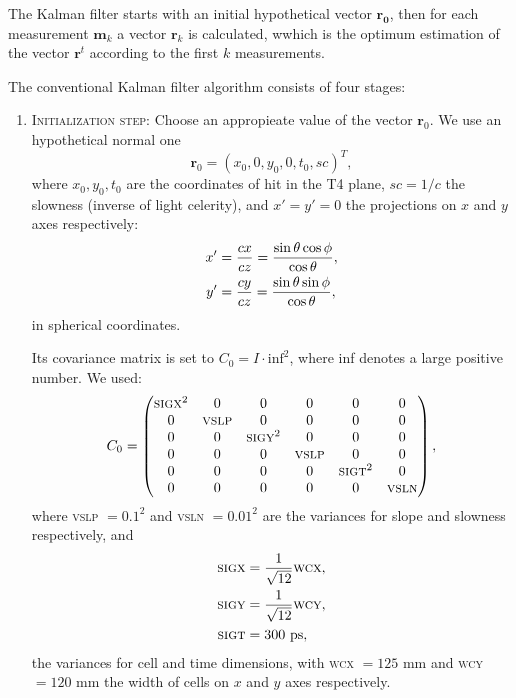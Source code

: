 \documentclass[a4paper]{book}
\let\vec\mathbf  %
\begin{document}
The Kalman filter starts with an initial hypothetical vector $\vec{r_0}$, then for each measurement $\vec{m}_k$ a vector $\vec{r}_k$ is calculated, wwhich is the optimum estimation of the vector $\vec{r}^t$ according to the first $k$ measurements.

The conventional Kalman filter algorithm consists of four stages:
\begin{enumerate}
	\item \textsc{Initialization step:} Choose an appropieate value of the vector $\vec{r}_0$. We use an hypothetical normal one
	\begin{equation}
	\vec{r}_0 = (x_0, 0, y_0, 0, t_0, sc)^T,
	\label{eq:ro}
	\end{equation}
	where $x_0, y_0, t_0$ are the coordinates of hit in the T4 plane, $sc = 1/c$ the slowness (inverse of light celerity), and $x' = y' = 0$ the projections on $x$ and $y$ axes respectively:
	\begin{align}
	\notag
	x' &= \frac{cx}{cz} = \frac{\sin\theta \cos \phi}{\cos \theta},\\
	y' &= \frac{cy}{cz} = \frac{\sin\theta \sin \phi}{\cos \theta},
	\label{eq:xpyp}
	\end{align}
	in spherical coordinates.
	
	Its covariance matrix is set to $C_0 = I \cdot \mathrm{inf}^2$, where inf denotes a large positive number. We used:
	\begin{equation}
	C_0 = 
	\left(
	\begin{matrix}
	\mathrm{\textsc{sigx}}^2 & 0           & 0               & 0           & 0               & 0      \\
	0             & \mathrm{\textsc{vslp}} & 0               & 0           & 0               & 0       \\
	0             & 0             & \mathrm{\textsc{sigy}}^2 & 0           & 0               & 0        \\
	0             & 0             & 0             & \mathrm{\textsc{vslp}} & 0               & 0         \\
	0             & 0             & 0             & 0             & \mathrm{\textsc{sigt}}^2 & 0          \\
	0             & 0             & 0             & 0             & 0             & \mathrm{\textsc{vsln}} \\
	\end{matrix}\right),
	\end{equation}
	where \textsc{vslp} $= 0.1^2$ and \textsc{vsln} $= 0.01^2$ are the variances for slope and slowness respectively, and
	\begin{align}
	\notag
	\mathrm{\textsc{sigx}} &= \frac{1}{\sqrt{12}} \mathrm{\textsc{wcx}},\\ \notag
	\mathrm{\textsc{sigy}} &= \frac{1}{\sqrt{12}} \mathrm{\textsc{wcy}},\\
	\mathrm{\textsc{sigt}} &= 300\ \mathrm{ps},
	\label{eq:sig}
	\end{align}
	the variances for cell and time dimensions, with \textsc{wcx} $= 125$ mm and \textsc{wcy} $= 120$ mm the width of cells on $x$ and $y$ axes respectively.
	

\end{enumerate}
\end{document}
